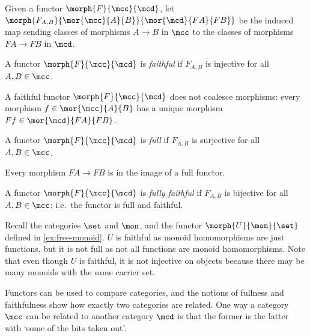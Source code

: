 \begin{notation}
    Given a functor \(\morph{F}{\mcc}{\mcd}\), let \(
    \morph{F_{A,B}}{\mor{\mcc}{A}{B}}{\mor{\mcd}{FA}{FB}}
    \) be the induced map sending classes of morphisms \(A \to B\) in \(\mcc\)
    to the classes of morphisms \(FA \to FB\) in \(\mcd\).
\end{notation}

\begin{definition}
    A functor \(\morph{F}{\mcc}{\mcd}\) is \emph{faithful} if \(F_{A,B}\) is
    injective for all \(A,B \in \mcc\).
\end{definition}

A faithful functor \(\morph{F}{\mcc}{\mcd}\) does not coalesce morphisms: every
morphism \(f \in \mor{\mcc}{A}{B}\) has a unique morphism
\(Ff \in \mor{\mcd}{FA}{FB}\).

\begin{definition}
    A functor \(\morph{F}{\mcc}{\mcd}\) is \emph{full} if \(F_{A,B}\) is
    surjective for all \(A,B \in \mcc\).
\end{definition}

Every morphism \(FA \to FB\) is in the image of a full functor.

\begin{definition}
    A functor \(\morph{F}{\mcc}{\mcd}\) is \emph{fully faithful} if \(F_{A,B}\)
    is bijective for all \(A, B \in \mcc\); i.e.\ the functor is full and
    faithful.
\end{definition}

\begin{example}
    Recall the categories \(\set\) and \(\mon\), and the functor
    \(\morph{U}{\mon}{\set}\) defined in \cref{ex:free-monoid}.
    \(U\) is faithful as monoid homomorphisms are just functions, but it is not
    full as not all functions are monoid homomorphisms.
    Note that even though \(U\) is faithful, it is not injective on objects
    because there may be many monoids with the same carrier set.
\end{example}

Functors can be used to compare categories, and the notions of fullness and
faithfulness show how exactly two categories are related.
One way a category \(\mcc\) can be related to another category \(\mcd\) is that
the former is the latter with `some of the bits taken out'.

